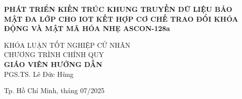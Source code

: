 \begin{titlepage}
\begin{center}
{ \Large \bfseries PHÁT TRIỂN KIẾN TRÚC KHUNG TRUYỀN DỮ LIỆU BẢO MẬT ĐA LỚP CHO IOT KẾT HỢP CƠ CHẾ TRAO ĐỔI KHÓA ĐỘNG VÀ MẬT MÃ HÓA NHẸ ASCON-128a\\[2cm] } 


\large KHÓA LUẬN TỐT NGHIỆP CỬ NHÂN\\
\large CHƯƠNG TRÌNH CHÍNH QUY\\[2cm]

\textbf{GIÁO VIÊN HƯỚNG DẪN}\\
PGS.TS. Lê Đức Hùng


\vfill
Tp. Hồ Chí Minh, tháng 07/2025

\end{center}

\end{titlepage}